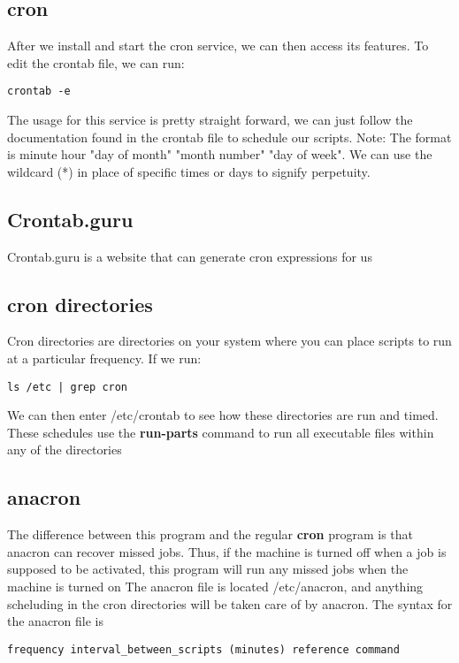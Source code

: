 \documentclass{report}
\begin{document}
    \pagebreak \bigbreak \noindent 
    \subsection{cron}
    \bigbreak \noindent 
    After we install and start the cron service, we can then access its features. To edit the crontab file, we can run:
    \begin{verbatim}
crontab -e
    \end{verbatim}
    \bigbreak \noindent 
    The usage for this service is pretty straight forward, we can just follow the documentation found in the crontab file to schedule our scripts.
    \bigbreak \noindent 
    Note: The format is minute hour "day of month" "month number" "day of week". We can use the wildcard (*) in place of specific times or days to signify perpetuity.

    \bigbreak \noindent 
    \subsection{Crontab.guru}
    \bigbreak \noindent 
    Crontab.guru is a website that can generate cron expressions for us

    \bigbreak \noindent 
    \subsection{cron directories}
    \bigbreak \noindent 
    \begin{concept}
        Cron directories are directories on your system where you can place scripts to run at a particular frequency. If we run:
    \end{concept}
    \bigbreak \noindent 
    \begin{verbatim}
ls /etc | grep cron
    \end{verbatim}
    \bigbreak \noindent
    We can then enter /etc/crontab to see how these directories are run and timed. These schedules use the \textbf{run-parts} command to run all executable files within any of the directories 

    \bigbreak \noindent 
    \subsection{anacron}
    \bigbreak \noindent 
    The difference between this program and the regular \textbf{cron} program is that anacron can recover missed jobs. Thus, if the machine is turned off when a job is supposed to be activated, this program will run any missed jobs when the machine is turned on 
    \bigbreak \noindent 
    The anacron file is located /etc/anacron, and anything scheluding in the cron directories will be taken care of by anacron. The syntax for the anacron file is 
    \bigbreak \noindent
\begin{verbatim}
frequency interval_between_scripts (minutes) reference command
\end{verbatim}
\bigbreak \noindent
    
    \pagebreak \bigbreak \noindent 
\end{document}
